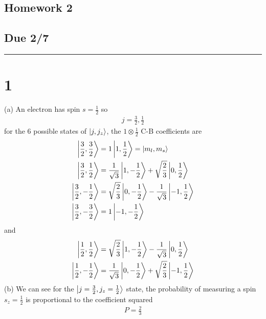 \documentclass[../main.tex]{subfiles}
\newcommand{\thf}{\frac{3}{2}}
\newcommand{\ohf}{\frac{1}{2}}
\begin{document}
\setcounter{section}{1}
\begin{center}
    \section*{Homework 2}
    \subsection*{Due 2/7}
\end{center}
\hrule \vspace{10px}

\section*{1} 
(a) An electron has spin $s = \frac{1}{2}$ so
\begin{align*}
    j = \frac{3}{2}, \ohf
\end{align*}
for the 6 possible states of $\ket {j, j_z}$, the $1 \otimes \ohf$ C-B coefficients are
\begin{align*}
    \ket{\thf, \thf} &=  1 \ket {1,\ohf} = \ket{m_l, m_s} \\
    \ket{\thf, \ohf} &= \frac{1}{\sqrt{3}} \ket {1,-\ohf} + \sqrt{\frac{2}{3}} \ket {0,\ohf} \\
    \ket{\thf, -\ohf} &= \sqrt{\frac{2}{3}} \ket {0,-\ohf} - \frac{1}{\sqrt{3}} \ket {-1,\ohf} \\
    \ket{\thf, -\thf} &= 1 \ket {-1,-\ohf}
\end{align*}
and
\begin{align*}
    \ket{\ohf, \ohf} &= \sqrt{\frac{2}{3}} \ket {1,-\ohf} - \frac{1}{\sqrt{3}} \ket {0,\ohf} \\
    \ket{\ohf, -\ohf} &= \frac{1}{\sqrt{3}} \ket {0,-\ohf} + \sqrt{\frac{2}{3}} \ket {-1,\ohf}
\end{align*}
(b) We can see for the $\ket{j=\thf, j_z = \ohf}$ state, the probability of measuring a spin
$s_z = \ohf$ is proportional to the coefficient squared
\begin{align*}
    P = \frac{2}{3}
\end{align*}
\end{document}
